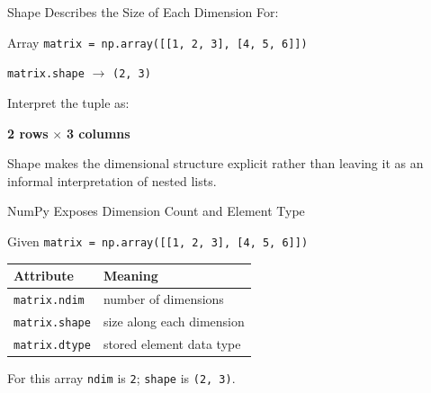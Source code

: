 \documentclass[aspectratio=169,10pt]{beamer}
\begin{document}
\begin{frame}{Shape Describes the Size of Each Dimension}
  For:

  \begin{block}{Array}
    \texttt{matrix = np.array([[1, 2, 3], [4, 5, 6]])}
  \end{block}

  \begin{center}
    \texttt{matrix.shape} $\rightarrow$ \texttt{(2, 3)}
  \end{center}

  Interpret the tuple as:

  \begin{center}
    \textbf{2 rows} $\times$ \textbf{3 columns}
  \end{center}

  \begin{keyidea}
    Shape makes the dimensional structure explicit rather than leaving it as an informal interpretation of nested lists.
  \end{keyidea}
\end{frame}

\begin{frame}{NumPy Exposes Dimension Count and Element Type}
  \begin{block}{Given}
    \texttt{matrix = np.array([[1, 2, 3], [4, 5, 6]])}
  \end{block}

  \begin{center}
    \renewcommand{\arraystretch}{1.35}
    \begin{tabular}{l|l}
      \textbf{Attribute} & \textbf{Meaning} \\\hline
      \texttt{matrix.ndim} & number of dimensions \\
      \texttt{matrix.shape} & size along each dimension \\
      \texttt{matrix.dtype} & stored element data type
    \end{tabular}
  \end{center}

  \begin{block}{For this array}
    \texttt{ndim} is \texttt{2}; \texttt{shape} is \texttt{(2, 3)}.
  \end{block}
\end{frame}
\end{document}
